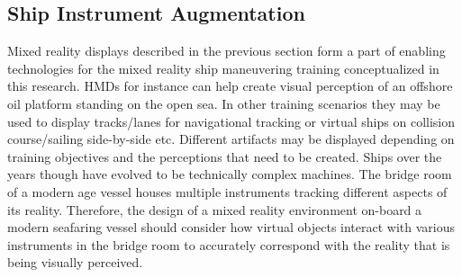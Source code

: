 
\subsection{Ship Instrument Augmentation}

Mixed reality displays described in the previous section form a part of enabling technologies for the mixed reality ship maneuvering training conceptualized in this research. HMDs for instance can help create visual perception of an offshore oil platform standing on the open sea. In other training scenarios they may be used to display tracks/lanes for navigational tracking or virtual ships on collision course/sailing side-by-side etc. Different artifacts may be displayed depending on training objectives and the perceptions that need to be created. Ships over the years though have evolved to be technically complex machines. The bridge room of a modern age vessel houses multiple instruments tracking different aspects of its reality. Therefore, the design of a mixed reality environment on-board a modern seafaring vessel should consider how virtual objects interact with various instruments in the bridge room to accurately correspond with the reality that is being visually perceived.  
%
%

